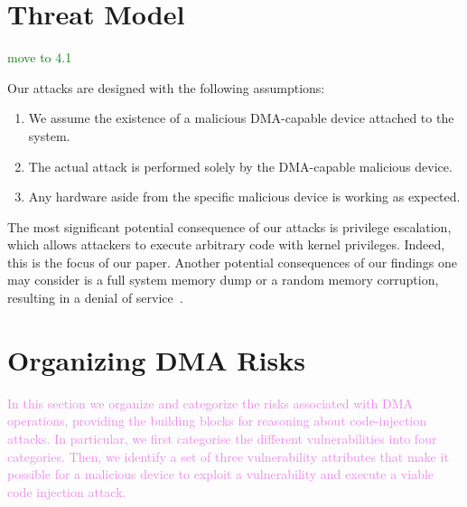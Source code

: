 \section{Threat Model}\label{sec:threat_model}
\textcolor{green}{move to 4.1}

Our attacks are designed with the following assumptions:
\begin{enumerate}
    \item We assume the existence of a malicious DMA-capable device attached to the system.
    \item The actual attack is performed solely by the DMA-capable malicious device.
    \item Any hardware aside from the specific malicious device is working as expected.
 \end{enumerate}

The most significant potential consequence of our attacks is privilege escalation, which allows attackers to execute arbitrary code with kernel privileges. Indeed, this is the focus of our paper. 
%
Another potential consequences of our findings one may consider is a full system memory dump
or a random memory corruption, resulting in a denial of service~\cite{MMT16}. 

\section{Organizing DMA Risks}\label{sec:dma-risks}
\textcolor{violet}{In this section we organize and categorize the risks associated with DMA operations, providing the building blocks for reasoning about code-injection attacks.
In particular, we first categorise the different \subpage{} vulnerabilities into four categories.
Then, we identify a set of three vulnerability attributes that make it possible for a malicious device to exploit a \subpage{} vulnerability and execute a viable code injection attack.}

